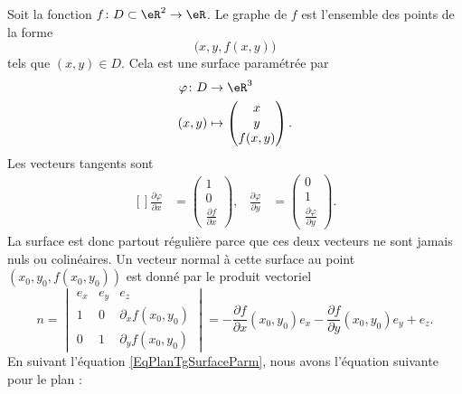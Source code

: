 Soit la fonction $f\colon D\subset\eR^2\to \eR$. Le graphe de $f$ est l'ensemble des points de la forme
\begin{equation}
    \big( x,y,f(x,y) \big)
\end{equation}
tels que $(x,y)\in D$. Cela est une surface paramétrée par
\begin{equation}
    \begin{aligned}
        \varphi\colon D&\to \eR^3 \\
        (x,y)&\mapsto \begin{pmatrix}
            x    \\
            y    \\
            f(x,y)
        \end{pmatrix}.
    \end{aligned}
\end{equation}
Les vecteurs tangents sont
\begin{equation}
    \begin{aligned}[]
        \frac{ \partial \varphi }{ \partial x }&=\begin{pmatrix}
            1    \\
            0    \\
            \frac{ \partial f }{ \partial x }
        \end{pmatrix},
        &\frac{ \partial \varphi }{ \partial y }&=\begin{pmatrix}
            0    \\
            1    \\
            \frac{ \partial \varphi }{ \partial y }
        \end{pmatrix}.
    \end{aligned}
\end{equation}
La surface est donc partout régulière parce que ces deux vecteurs ne sont jamais nuls ou colinéaires. Un vecteur normal à cette surface au point $(x_0,y_0,f(x_0,y_0))$ est donné par le produit vectoriel
\begin{equation}
    n=\begin{vmatrix}
         e_x   &   e_y    &   e_z    \\
        1    &   0    &   \partial_xf(x_0,y_0)    \\
        0    & 1    &   \partial_yf(x_0,y_0)
    \end{vmatrix}
    =-\frac{ \partial f }{ \partial x }(x_0,y_0)e_x-\frac{ \partial f }{ \partial y }(x_0,y_0)e_y+e_z.
\end{equation}
En suivant l'équation \eqref{EqPlanTgSurfaceParm}, nous avons l'équation suivante pour le plan :
